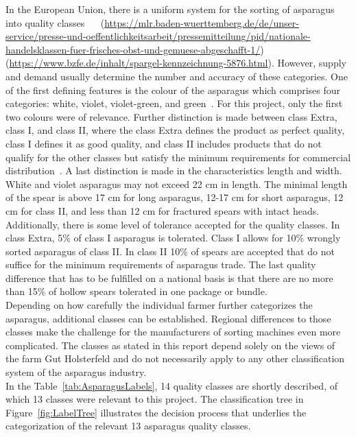 In the European Union, there is a uniform system for the sorting of asparagus into quality classes~\citep{euspargelnorm} ~\citep{unspargelnorm} (\url{https://mlr.baden-wuerttemberg.de/de/unser-service/presse-und-oeffentlichkeitsarbeit/pressemitteilung/pid/nationale-handelsklassen-fuer-frisches-obst-und-gemuese-abgeschafft-1/})(\url{https://www.bzfe.de/inhalt/spargel-kennzeichnung-5876.html}). However, supply and demand usually determine the number and accuracy of these categories. One of the first defining features is the colour of the asparagus which comprises four categories: white, violet, violet-green, and green~\citep{euspargelnorm}. For this project, only the first two colours were of relevance. Further distinction is made between class Extra, class I, and class II, where the class Extra defines the product as perfect quality, class I defines it as good quality, and class II includes products that do not qualify for the other classes but satisfy the minimum requirements for commercial distribution~\citep{euspargelnorm}. A last distinction is made in the characteristics length and width. White and violet asparagus may not exceed 22 cm in length. The minimal length of the spear is above 17 cm for long asparagus, 12-17 cm for short asparagus, 12 cm for class II, and less than 12 cm for fractured spears with intact heads. Additionally, there is some level of tolerance accepted for the quality classes. In class Extra, 5\% of class I asparagus is tolerated. Class I allows for 10\% wrongly sorted asparagus of class II. In class II 10\% of spears are accepted that do not suffice for the minimum requirements of asparagus trade. The last quality difference that has to be fulfilled on a national basis is that there are no more than 15\% of hollow spears tolerated in one package or bundle. \\
Depending on how carefully the individual farmer further categorizes the asparagus, additional classes can be established. Regional differences to those classes make the challenge for the manufacturers of sorting machines even more complicated. The classes as stated in this report depend solely on the views of the farm Gut Holsterfeld and do not necessarily apply to any other classification system of the asparagus industry. \\
In the Table~\ref{tab:AsparagusLabels}, 14 quality classes are shortly described, of which 13 classes were relevant to this project. The classification tree in Figure~\ref{fig:LabelTree} illustrates the decision process that underlies the categorization of the relevant 13 asparagus quality classes.

